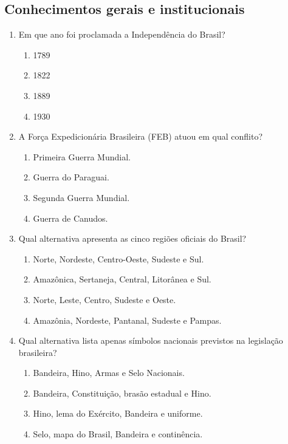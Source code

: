 \documentclass[12pt,a4paper]{article}
\begin{document}
\subsection*{Conhecimentos gerais e institucionais}
\begin{enumerate}[resume]
  \item Em que ano foi proclamada a Independência do Brasil?
  \begin{enumerate}[label=\alph*)]
    \item 1789
    \item 1822
    \item 1889
    \item 1930
  \end{enumerate}

  \item A Força Expedicionária Brasileira (FEB) atuou em qual conflito?
  \begin{enumerate}[label=\alph*)]
    \item Primeira Guerra Mundial.
    \item Guerra do Paraguai.
    \item Segunda Guerra Mundial.
    \item Guerra de Canudos.
  \end{enumerate}

  \item Qual alternativa apresenta as cinco regiões oficiais do Brasil?
  \begin{enumerate}[label=\alph*)]
    \item Norte, Nordeste, Centro-Oeste, Sudeste e Sul.
    \item Amazônica, Sertaneja, Central, Litorânea e Sul.
    \item Norte, Leste, Centro, Sudeste e Oeste.
    \item Amazônia, Nordeste, Pantanal, Sudeste e Pampas.
  \end{enumerate}

  \item Qual alternativa lista apenas símbolos nacionais previstos na legislação brasileira?
  \begin{enumerate}[label=\alph*)]
    \item Bandeira, Hino, Armas e Selo Nacionais.
    \item Bandeira, Constituição, brasão estadual e Hino.
    \item Hino, lema do Exército, Bandeira e uniforme.
    \item Selo, mapa do Brasil, Bandeira e continência.
  \end{enumerate}
\end{enumerate}
\end{document}
